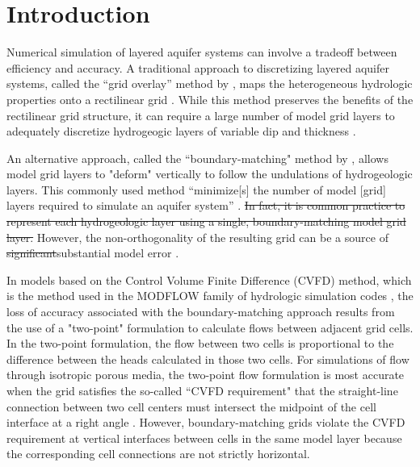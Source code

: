\documentclass{article}
\begin{document}

\section*{Introduction}

Numerical simulation of layered aquifer systems can involve a tradeoff between efficiency and accuracy. A traditional approach to discretizing layered aquifer systems, called the ``grid overlay'' method by \cite{hoaglund2003}, maps the heterogeneous hydrologic properties onto a rectilinear grid \citep{modflow84}. While this method preserves the benefits of the rectilinear grid structure, it can require a large number of model grid layers to adequately discretize hydrogeogic layers of variable dip and thickness \citep{Zyvoloski2006}.

An alternative approach, called the ``boundary-matching" method by \cite{hoaglund2003}, allows model grid layers to "deform" vertically to follow the undulations of hydrogeologic layers. This {\color{red} commonly used} method ``minimize[s] the number of model [grid] layers required to simulate an aquifer system'' \citep{modflow84}. {\color{red} \sout{In fact, it is common practice to represent each hydrogeologic layer using a single, boundary-matching model grid layer. }}However, the non-orthogonality of the resulting grid can be a source of {\color{red} \sout{significant}substantial} model error \citep{hoaglund2003}.

In models based on the Control Volume Finite Difference {\color{red} (CVFD)} method, which is the method used in the MODFLOW family of hydrologic simulation codes \citep{modflow6gwf, langevin2024}, the loss of accuracy associated with the boundary-matching approach results from the use of a "two-point" formulation to calculate flows between adjacent grid cells. In the two-point formulation, the flow between two cells is proportional to the difference between the heads calculated in those two cells. For simulations of flow through isotropic porous media, the two-point flow formulation is most accurate when the grid satisfies the so-called ``CVFD requirement" \citep{modflowusg, modflow6gwf} that the straight-line connection between two cell centers must intersect the midpoint of the cell interface at a right angle \citep{narasimhan1976integrated}. However, boundary-matching grids violate the CVFD requirement at vertical interfaces between cells in the same model layer because the corresponding cell connections are not strictly horizontal.
\end{document}
